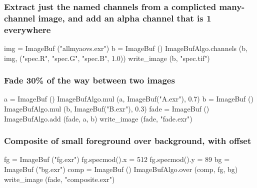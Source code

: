 \subsubsection*{Extract just the named channels from a complicted many-channel
image, and add an alpha channel that is 1 everywhere}
\begin{code}
    img = ImageBuf ("allmyaovs.exr")
    b = ImageBuf ()
    ImageBufAlgo.channels (b, img, ("spec.R", "spec.G", "spec.B", 1.0))
    write_image (b, "spec.tif")
\end{code}


\subsubsection*{Fade 30\% of the way between two images}

\begin{code}
    a = ImageBuf ()
    ImageBufAlgo.mul (a, ImageBuf("A.exr"), 0.7)
    b = ImageBuf ()
    ImageBufAlgo.mul (b, ImageBuf("B.exr"), 0.3)
    fade = ImageBuf ()
    ImageBufAlgo.add (fade, a, b)
    write_image (fade, "fade.exr")
\end{code}


\subsubsection*{Composite of small foreground over background, with offset}

\begin{code}
    fg = ImageBuf ("fg.exr")
    fg.specmod().x = 512
    fg.specmod().y = 89
    bg = ImageBuf ("bg.exr")
    comp = ImageBuf ()
    ImageBufAlgo.over (comp, fg, bg)
    write_image (fade, "composite.exr")
\end{code}





\chapwidthend

